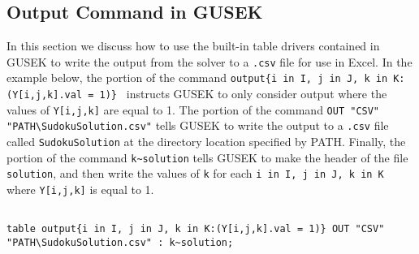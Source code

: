 \documentclass[10pt]{article}
\begin{document}
\subsection{Output Command in GUSEK}
\label{sec:outputgusek}

In this section we discuss how to use the built-in table drivers contained in GUSEK to write the output from the solver to a {\tt .csv} file for use in Excel.  In the example below, the portion of the command {\tt output\{i in I, j in J, k in K:(Y[i,j,k].val = 1)\} } instructs GUSEK to only consider output where the values of {\tt Y[i,j,k]} are equal to 1.  The portion of the command {\tt OUT "CSV" "PATH\textbackslash SudokuSolution.csv"} tells GUSEK to write the output to a {\tt .csv} file called {\tt SudokuSolution} at the directory location specified by PATH.  Finally, the portion of the command {\tt k\textasciitilde solution} tells GUSEK to make the header of the file {\tt solution}, and then write the values of {\tt k} for each {\tt i in I, j in J, k in K} where {\tt Y[i,j,k]} is equal to 1.

\begin{verbatim}

table output{i in I, j in J, k in K:(Y[i,j,k].val = 1)} OUT "CSV" "PATH\SudokuSolution.csv" : k~solution;

\end{verbatim}
\end{document}
